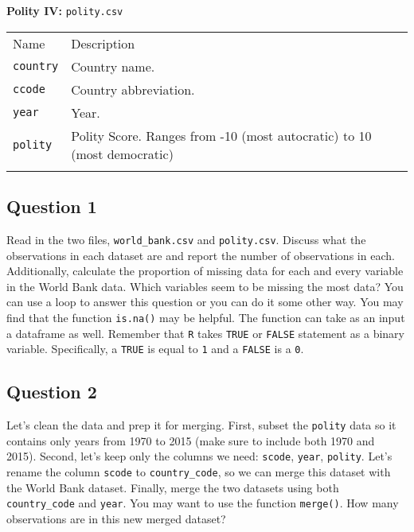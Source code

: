 \documentclass[]{article}
\begin{document}
\textbf{Polity IV:} \texttt{polity.csv}

\begin{longtable}[c]{@{}ll@{}}
\toprule\addlinespace
Name & Description
\\\addlinespace
\midrule\endhead
\texttt{country} & Country name.
\\\addlinespace
\texttt{ccode} & Country abbreviation.
\\\addlinespace
\texttt{year} & Year.
\\\addlinespace
\texttt{polity} & Polity Score. Ranges from -10 (most autocratic) to 10
(most democratic)
\\\addlinespace
\bottomrule
\end{longtable}

\subsection{Question 1}\label{question-1}

Read in the two files, \texttt{world\_bank.csv} and \texttt{polity.csv}.
Discuss what the observations in each dataset are and report the number
of observations in each. Additionally, calculate the proportion of
missing data for each and every variable in the World Bank data. Which
variables seem to be missing the most data? You can use a loop to answer
this question or you can do it some other way. You may find that the
function \texttt{is.na()} may be helpful. The function can take as an
input a dataframe as well. Remember that \texttt{R} takes \texttt{TRUE}
or \texttt{FALSE} statement as a binary variable. Specifically, a
\texttt{TRUE} is equal to \texttt{1} and a \texttt{FALSE} is a
\texttt{0}.

\subsection{Question 2}\label{question-2}

Let's clean the data and prep it for merging. First, subset the
\texttt{polity} data so it contains only years from 1970 to 2015 (make
sure to include both 1970 and 2015). Second, let's keep only the columns
we need: \texttt{scode}, \texttt{year}, \texttt{polity}. Let's rename
the column \texttt{scode} to \texttt{country\_code}, so we can merge
this dataset with the World Bank dataset. Finally, merge the two
datasets using both \texttt{country\_code} and \texttt{year}. You may
want to use the function \texttt{merge()}. How many observations are in
this new merged dataset?
\end{document}
